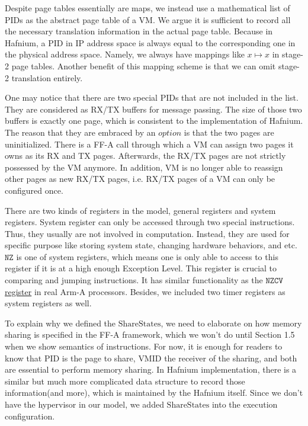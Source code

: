 \documentclass[a4paper]{article}
\newcommand*{\SSS}{\text{ShareStates}}
\newcommand*{\PID}{\text{PID}}
\newcommand*{\VMID}{\text{VMID}}
\begin{document}
Despite page tables essentially are maps, we instead use a mathematical list of
$\PID$s as the abstract page table of a VM.
We argue it is sufficient to record all the necessary translation
information in the actual page table. Because in Hafnium, a $\PID$ in IP address
space is always equal to the corresponding one in the physical address space.
Namely, we always have mappings like $x \mapsto x$ in stage-2 page tables.
Another benefit of this mapping scheme is that we can omit stage-2 translation entirely.

One may notice that there are two special $\PID$s that are not included in the
list. They are considered as RX/TX buffers for message passing. The size of
those two buffers is exactly one page, which is consistent to the
implementation of Hafnium. The reason that they are embraced by an $option$ is
that the two pages are uninitialized. There is a FF-A call through which a VM
can assign two pages it owns as its RX and TX pages. Afterwards, the RX/TX pages
are not strictly possessed by the VM anymore. In addition, VM is no longer able to
reassign other pages as new RX/TX pages, i.e. RX/TX pages of a VM can only be
configured once.

There are two kinds of registers in the model, general registers and system registers.
System register can only be accessed through two special instructions. Thus, they usually are not involved in computation. Instead, they are used for specific purpose like storing system state, changing hardware behaviors, and etc.
 $\mathtt{NZ}$ is one of system registers, which means one
is only able to access to this register if it is at a high enough Exception
Level. This register is crucial to comparing and jumping instructions. It has
similar functionality as the
\href{https://developer.arm.com/docs/ddi0595/h/aarch64-system-registers/nzcv}
{$\mathtt{NZCV}$ register} in real Arm-A processors. Besides, we included two timer registers as system registers as well.

To explain why we defined the $\SSS$, we need to elaborate on how memory sharing is
specified in the FF-A framework, which we won't do until Section 1.5 when we
show semantics of instructions. For now, it is enough for readers to know that $\PID$ is
the page to share, $\VMID$ the receiver of the sharing, and both are essential
to perform memory sharing. In Hafnium implementation, there is a similar but
much more complicated data structure to record those information(and more),
which is maintained by the Hafnium itself. Since we don't have the hypervisor in
our model, we added $\SSS$ into the execution configuration.
\end{document}
